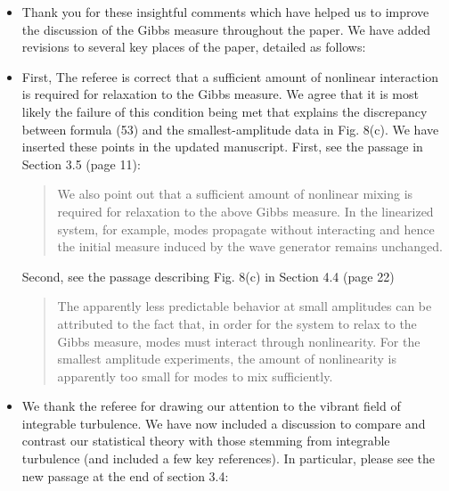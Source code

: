 \documentclass[11pt]{article}
\begin{document}
\begin{itemize}
\item Thank you for these insightful comments which have helped us to improve the discussion of the Gibbs measure throughout the paper. We have added revisions to several key places of the paper, detailed as follows:
\item First, The referee is correct that a sufficient amount of nonlinear interaction is  required for relaxation to the Gibbs measure. We agree that it is most likely the failure of this condition being met that explains the discrepancy between formula (53) and the smallest-amplitude data in Fig. 8(c). We have inserted these points in the updated manuscript. First, see the passage in Section 3.5 (page 11):
\begin{quotation}
We also point out that a sufficient amount of nonlinear mixing is required for relaxation to the above Gibbs measure. In the linearized system, for example, modes propagate without interacting and hence the initial measure induced by the wave generator remains unchanged.
\end{quotation}
Second, see the passage describing Fig. 8(c) in Section 4.4 (page 22)
\begin{quotation}
The apparently less predictable behavior at small amplitudes can be attributed to the fact that, in order for the system to relax to the Gibbs measure, modes must interact through nonlinearity. For the smallest amplitude experiments, the amount of nonlinearity is apparently too small for  modes to mix sufficiently.
\end{quotation}
%
\item We thank the referee for drawing our attention to the vibrant field of integrable turbulence. We have now included a discussion to compare and contrast our statistical theory with those stemming from integrable turbulence (and included a few key references). In particular, please see the new passage at the end of section 3.4:
\begin{quotation}

\end{quotation}
\end{itemize}
\end{document}
